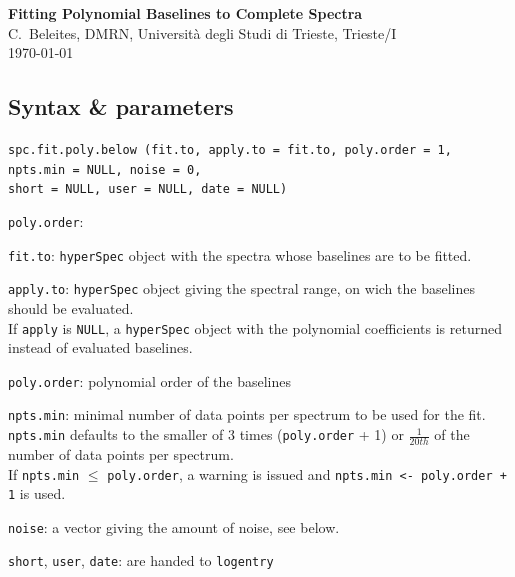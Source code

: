\documentclass[a4paper, 10pt, smallheadings, DIV15]{scrartcl}
\newcommand{\code}[1]{\nohyphens{\texttt{#1}}\xspace}
\begin{document}
\renewenvironment{Schunk}{\vspace{\topsep}}{\vspace{\topsep}}
{\center \sffamily \huge 
\textbf{Fitting Polynomial Baselines to Complete Spectra}\\[1ex] 
\large C.~Beleites,	DMRN, Università degli Studi di Trieste, Trieste/I\\[1ex] 
\today\\}

\subsection*{Syntax \& parameters} \code{spc.fit.poly.below (fit.to, apply.to = fit.to, 
poly.order = 1, npts.min = NULL, noise = 0,\\
short = NULL, user = NULL, date = NULL)}

\begin{labeling}{\code{poly.order}:~~~}
\item[\code{fit.to}:] \code{hyperSpec} object with the spectra whose baselines are to be fitted.
\item[\code{apply.to}:] \code{hyperSpec} object giving the spectral range, on wich the baselines should be evaluated.\\
 If \code{apply} is \code{NULL}, a \code{hyperSpec} object with the polynomial coefficients is returned 
 instead of evaluated baselines. 
\item[\code{poly.order}:] polynomial order of the baselines
\item[\code{npts.min}:] minimal number of data points per spectrum to be used for the fit.\\
\code{npts.min} defaults to the smaller of 3 times (\code{poly.order} + 1) or 
$\frac{1}{20th}$ of the number of data points per spectrum.\\
If \code{npts.min} $\leq$ \code{poly.order}, a warning is issued and \code{npts.min <- poly.order + 1} is used.   
 \item[\code{noise}:] a vector giving the amount of noise, see below. 
 \item[\code{short}, \code{user}, \code{date}:] are handed to \code{logentry}
 \end{labeling}
\end{document}
